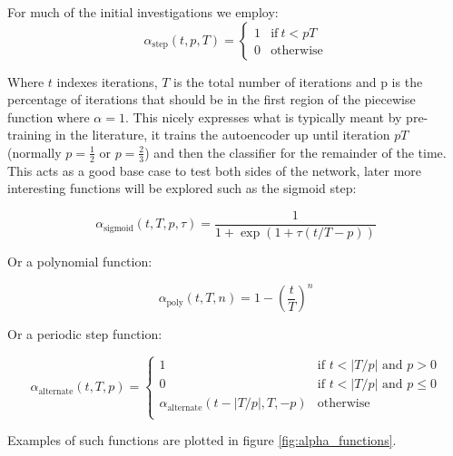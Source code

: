     For much of the initial investigations we employ:
    \begin{equation}
      \alpha_{\text{step}}(t,p,T) =
      \begin{cases}
        1           & \text{if}\ t<pT \\
        0           & \text{otherwise}
      \end{cases}
    \end{equation}

    Where $t$ indexes iterations, $T$ is the total number of iterations and p is the
    percentage of iterations that should be in the first region of the piecewise function
    where $\alpha=1$.
    This nicely expresses what is typically meant by pre-training in the literature, it trains
    the autoencoder up until iteration $pT$ (normally $p=\frac{1}{2}$ or $p=\frac{2}{3}$) and then the classifier for the remainder of the time.
    This acts as a good base case to test both sides of the network, later more interesting
    functions will be explored such as the sigmoid step:

    \begin{equation}
      \alpha_{\text{sigmoid}}(t,T,p,\tau) = \frac{1}{1 + \exp(1 + \tau (t/T - p))}
    \end{equation}

    Or a polynomial function:

    \begin{equation}
      \alpha_{\text{poly}}(t,T,n) = 1 - \left ( \frac{t}{T} \right )^n
    \end{equation}

    Or a periodic step function:

    \begin{equation}
      \alpha_{\text{alternate}}(t,T,p) =
      \begin{cases}
        1           & \text{if } t < |T/p| \text{ and } p > 0\\
        0           & \text{if } t < |T/p| \text{ and } p \leq 0\\
        \alpha_{\text{alternate}}(t-|T/p|,T,-p)           & \text{otherwise} \\
      \end{cases}
    \end{equation}

    Examples of such functions are plotted in figure \ref{fig:alpha_functions}.

